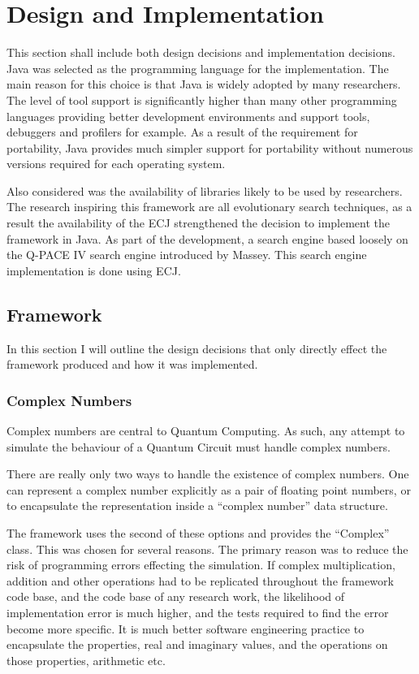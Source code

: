 \chapter{Design and Implementation}
\lstset{language=Java}
This section shall include both design decisions and implementation decisions.
Java was selected as the programming language for the implementation.
The main reason for this choice is that Java is widely adopted by many researchers.
The level of tool support is significantly higher than many other programming languages providing better development environments and support tools, debuggers and profilers for example. 
As a result of the requirement for portability, Java provides much simpler support for portability without numerous versions required for each operating system.

Also considered was the availability of libraries likely to be used by researchers.
The research inspiring this framework are all evolutionary search techniques, as a result the availability of the ECJ\cite{ecjtool} strengthened the decision to implement the framework in Java.
As part of the development, a search engine based loosely on the Q-PACE IV search engine introduced by Massey\cite{masseythesis}.
This search engine implementation is done using ECJ.

\section{Framework}
In this section I will outline the design decisions that only directly effect the framework produced and how it was implemented.

\subsection{Complex Numbers}
Complex numbers are central to Quantum Computing.
As such, any attempt to simulate the behaviour of a Quantum Circuit must handle complex numbers.

There are really only two ways to handle the existence of complex numbers.
One can represent a complex number explicitly as a pair of floating point numbers, or to encapsulate the representation inside a ``complex number'' data structure.

The framework uses the second of these options and provides the ``Complex'' class.
This was chosen for several reasons.
The primary reason was to reduce the risk of programming errors effecting the simulation.
If complex multiplication, addition and other operations had to be replicated throughout the framework code base, and the code base of any research work, the likelihood of implementation error is much higher, and the tests required to find the error become more specific.
It is much better software engineering practice to encapsulate the properties, real and imaginary values, and the operations on those properties, arithmetic etc.

